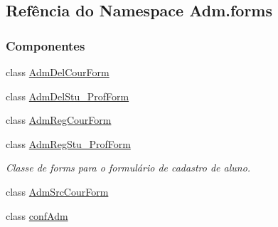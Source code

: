 \hypertarget{namespaceAdm_1_1forms}{}\subsection{Refência do Namespace Adm.\+forms}
\label{namespaceAdm_1_1forms}
\subsubsection*{Componentes}
\begin{DoxyCompactItemize}
\item 
class \hyperlink{classAdm_1_1forms_1_1AdmDelCourForm}{Adm\+Del\+Cour\+Form}
\item 
class \hyperlink{classAdm_1_1forms_1_1AdmDelStu__ProfForm}{Adm\+Del\+Stu\+\_\+\+Prof\+Form}
\item 
class \hyperlink{classAdm_1_1forms_1_1AdmRegCourForm}{Adm\+Reg\+Cour\+Form}
\item 
class \hyperlink{classAdm_1_1forms_1_1AdmRegStu__ProfForm}{Adm\+Reg\+Stu\+\_\+\+Prof\+Form}
\begin{DoxyCompactList}\small\item\em Classe de forms para o formulário de cadastro de aluno. \end{DoxyCompactList}\item 
class \hyperlink{classAdm_1_1forms_1_1AdmSrcCourForm}{Adm\+Src\+Cour\+Form}
\item 
class \hyperlink{classAdm_1_1forms_1_1confAdm}{conf\+Adm}
\end{DoxyCompactItemize}
